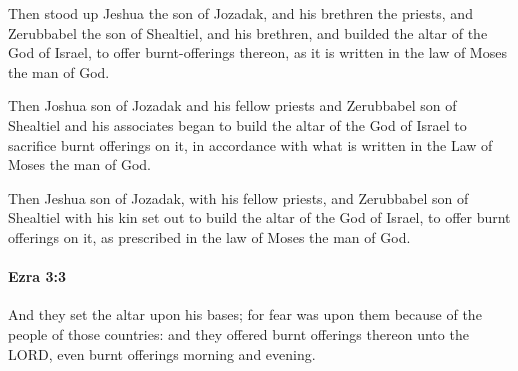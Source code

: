 			\begin{versebox}
					\item[BHS] 
					\item[LXX] 
					\item[ASV] Then stood up Jeshua the son of Jozadak, and his brethren the priests, and Zerubbabel the son of Shealtiel, and his brethren, and builded the altar of the God of Israel, to offer burnt-offerings thereon, as it is written in the law of Moses the man of God.
					\item[NIV] Then Joshua son of Jozadak and his fellow priests and Zerubbabel son of Shealtiel and his associates began to build the altar of the God of Israel to sacrifice burnt offerings on it, in accordance with what is written in the Law of Moses the man of God.
					\item[NRSV] Then Jeshua son of Jozadak, with his fellow priests, and Zerubbabel son of Shealtiel with his kin set out to build the altar of the God of Israel, to offer burnt offerings on it, as prescribed in the law of Moses the man of God.
			\end{versebox}

		\paragraph{Ezra 3:3} %
			\label{EZRA-3-3}

			And they set the altar upon his bases; for fear was upon them because of the people of those countries: and they offered burnt offerings thereon unto the LORD, even burnt offerings morning and evening.

